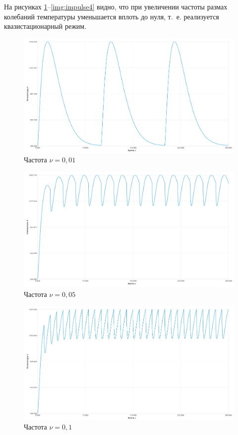 \documentclass[a4paper,oneside,12pt]{extreport}
\begin{document}
\begin{enumerate}
	На рисунках \ref{img:impulse1}–\ref{img:impulse4} видно, что при увеличении частоты размах колебаний температуры уменьшается вплоть до нуля, т.~е. реализуется квазистационарный режим.

	\begin{figure}[H]
		\centering
		\includegraphics[width=0.75\linewidth]{inc/img/impulse1.png}
		\caption{Частота $\nu = 0,01$}
		\label{img:impulse1}
	\end{figure}

	\begin{figure}[H]
		\centering
		\includegraphics[width=0.75\linewidth]{inc/img/impulse2.png}
		\caption{Частота $\nu = 0,05$}
		\label{img:impulse2}
	\end{figure}

	\begin{figure}[H]
		\centering
		\includegraphics[width=0.75\linewidth]{inc/img/impulse3.png}
		\caption{Частота $\nu = 0,1$}
		\label{img:impulse3}
	\end{figure}


\end{enumerate}
\end{document}
